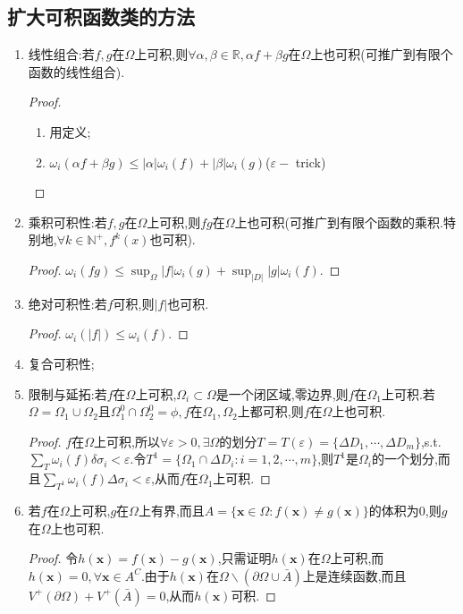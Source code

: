 \documentclass[UTF8]{ctexart}
\newcommand{\x}{\boldsymbol{x}}
\begin{document}
    \subsection{扩大可积函数类的方法}
    \begin{enumerate}
        \item 线性组合:若$f,g$在$\Omega$上可积,则$\forall\alpha,\beta\in\mathbb{R},\alpha f+\beta g$在$\Omega$上也可积(可推广到有限个函数的线性组合).
        \begin{proof}
            \begin{enumerate}[{方法}1]
                \item 用定义;
                \item $\omega_i(\alpha f+\beta g)\le |\alpha|\omega_i(f)+|\beta|\omega_i(g)$($\varepsilon-$ trick)
            \end{enumerate}
        \end{proof}
        \item 乘积可积性:若$f,g$在$\Omega$上可积,则$fg$在$\Omega$上也可积(可推广到有限个函数的乘积.特别地,$\forall k\in\mathbb{N}^+,f^k(x)$也可积).
        \begin{proof}
            $\omega_i(fg)\le \sup_{\Omega}|f|\omega_i(g)+\sup_{|D|}|g|\omega_i(f)$.
        \end{proof}
        \item 绝对可积性:若$f$可积,则$|f|$也可积.
        \begin{proof}
            $\omega_i(|f|)\le\omega_i(f)$.
        \end{proof}
        \item 复合可积性;
        \item 限制与延拓:若$f$在$\Omega$上可积,$\Omega_i\subset\Omega$是一个闭区域,零边界,则$f$在$\Omega_1$上可积.若$\Omega=\Omega_1\cup\Omega_2$且$\Omega_1^0\cap\Omega_2^0=\phi,f$在$\Omega_1,\Omega_2$上都可积,则$f$在$\Omega$上也可积.
        \begin{proof}
            $f$在$\Omega$上可积,所以$\forall\varepsilon>0,\exists\Omega$的划分$T=T(\varepsilon)=\{\Delta D_1,\cdots,\Delta D_m\}$,s.t.$\sum_T\omega_i(f)\delta\sigma_i<\varepsilon$.令$T^1=\{\Omega_1\cap\Delta D_i:i=1,2,\cdots,m\}$,则$T^1$是$\Omega_i$的一个划分,而且$\sum_{T^1}\omega_i(f)\Delta\sigma_i<\varepsilon$,从而$f$在$\Omega_1$上可积.
        \end{proof}
        \item 若$f$在$\Omega$上可积,$g$在$\Omega$上有界,而且$A=\{\x\in\Omega:f(\x)\not=g(\x)\}$的体积为0,则$g$在$\Omega$上也可积.
        \begin{proof}
            令$h(\x)=f(\x)-g(\x)$,只需证明$h(\x)$在$\Omega$上可积,而$h(\x)=0,\forall\x\in A^C$.由于$h(\x)$在$\Omega\backslash(\partial\Omega\cup\bar{A})$上是连续函数,而且$V^+(\partial\Omega)+V^+(\bar{A})=0$,从而$h(\x)$可积.
        \end{proof}
    \end{enumerate}
    
\end{document}
